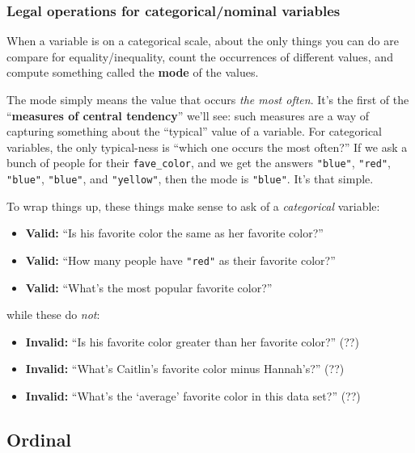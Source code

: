 \subsubsection{Legal operations for categorical/nominal variables}

When a variable is on a categorical scale, about the only things you can do are
compare for equality/inequality, count the occurrences of different values, and
compute something called the \textbf{mode} of the values.

\label{mode}
The mode simply means the value that occurs \textit{the most often}. It's the
first of the ``\textbf{measures of central tendency}'' we'll see: such measures
are a way of capturing something about the ``typical'' value of a variable. For
categorical variables, the only typical-ness is ``which one occurs the most
often?'' If we ask a bunch of people for their \texttt{fave\_color}, and we get
the answers \texttt{"blue"}, \texttt{"red"}, \texttt{"blue"}, \texttt{"blue"},
and \texttt{"yellow"}, then the mode is \texttt{"blue"}. It's that simple.

To wrap things up, these things make sense to ask of a \textit{categorical}
variable:

\begin{itemize}[nosep]
\item \textbf{Valid:} ``Is his favorite color the same as her favorite color?''
\item \textbf{Valid:} ``How many people have \texttt{"red"} as their favorite
color?''
\item \textbf{Valid:} ``What's the most popular favorite color?''
\end{itemize}

while these do \textit{not}:

\begin{itemize}[nosep]
\item \textbf{Invalid:} ``Is his favorite color greater than her favorite
color?'' (??)
\item \textbf{Invalid:} ``What's Caitlin's favorite color minus Hannah's?'' (??)
\item \textbf{Invalid:} ``What's the `average' favorite color in this data
set?'' (??)
\end{itemize}


\subsection{Ordinal}

